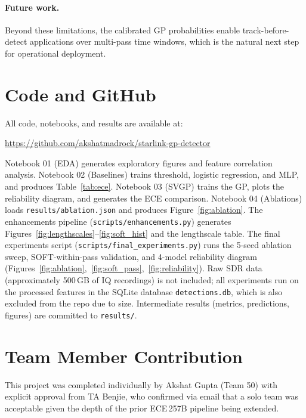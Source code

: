 \documentclass{article}
\begin{document}
\paragraph{Future work.}
Beyond these limitations, the calibrated GP probabilities enable
track-before-detect applications over multi-pass time windows, which is the
natural next step for operational deployment.

\section*{Code and GitHub}

All code, notebooks, and results are available at:
\begin{center}
  \url{https://github.com/akshatmadrock/starlink-gp-detector}
\end{center}
Notebook 01 (EDA) generates exploratory figures and feature correlation analysis.
Notebook 02 (Baselines) trains threshold, logistic regression, and MLP, and
produces Table~\ref{tab:ece}. Notebook 03 (SVGP) trains the GP, plots the
reliability diagram, and generates the ECE comparison. Notebook 04 (Ablations)
loads \texttt{results/ablation.json} and produces Figure~\ref{fig:ablation}.
The enhancements pipeline (\texttt{scripts/enhancements.py}) generates
Figures~\ref{fig:lengthscales}--\ref{fig:soft_hist} and the lengthscale table.
The final experiments script (\texttt{scripts/final\_experiments.py}) runs the
5-seed ablation sweep, SOFT-within-pass validation, and 4-model reliability diagram
(Figures~\ref{fig:ablation},~\ref{fig:soft_pass},~\ref{fig:reliability}).
Raw SDR data (approximately 500\,GB of IQ recordings) is not included; all
experiments run on the processed features in the SQLite database
\texttt{detections.db}, which is also excluded from the repo due to size.
Intermediate results (metrics, predictions, figures) are committed to
\texttt{results/}.

\section*{Team Member Contribution}

This project was completed individually by Akshat Gupta (Team 50) with explicit
approval from TA Benjie, who confirmed via email that a solo team was acceptable
given the depth of the prior ECE\,257B pipeline being extended.
\end{document}
